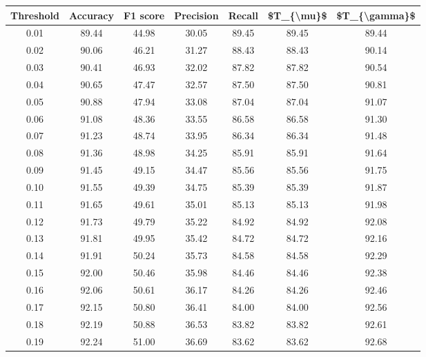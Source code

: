 \begin{tabular}{|c|c|c|c|c|c|c|}
\hline
 Threshold &  Accuracy &  F1 score &  Precision &  Recall &  \$T\_\{\textbackslash mu\}\$ &  \$T\_\{\textbackslash gamma\}\$ \\
\hline
      0.01 &     89.44 &     44.98 &      30.05 &   89.45 &      89.45 &         89.44 \\
      0.02 &     90.06 &     46.21 &      31.27 &   88.43 &      88.43 &         90.14 \\
      0.03 &     90.41 &     46.93 &      32.02 &   87.82 &      87.82 &         90.54 \\
      0.04 &     90.65 &     47.47 &      32.57 &   87.50 &      87.50 &         90.81 \\
      0.05 &     90.88 &     47.94 &      33.08 &   87.04 &      87.04 &         91.07 \\
      0.06 &     91.08 &     48.36 &      33.55 &   86.58 &      86.58 &         91.30 \\
      0.07 &     91.23 &     48.74 &      33.95 &   86.34 &      86.34 &         91.48 \\
      0.08 &     91.36 &     48.98 &      34.25 &   85.91 &      85.91 &         91.64 \\
      0.09 &     91.45 &     49.15 &      34.47 &   85.56 &      85.56 &         91.75 \\
      0.10 &     91.55 &     49.39 &      34.75 &   85.39 &      85.39 &         91.87 \\
      0.11 &     91.65 &     49.61 &      35.01 &   85.13 &      85.13 &         91.98 \\
      0.12 &     91.73 &     49.79 &      35.22 &   84.92 &      84.92 &         92.08 \\
      0.13 &     91.81 &     49.95 &      35.42 &   84.72 &      84.72 &         92.16 \\
      0.14 &     91.91 &     50.24 &      35.73 &   84.58 &      84.58 &         92.29 \\
      0.15 &     92.00 &     50.46 &      35.98 &   84.46 &      84.46 &         92.38 \\
      0.16 &     92.06 &     50.61 &      36.17 &   84.26 &      84.26 &         92.46 \\
      0.17 &     92.15 &     50.80 &      36.41 &   84.00 &      84.00 &         92.56 \\
      0.18 &     92.19 &     50.88 &      36.53 &   83.82 &      83.82 &         92.61 \\
      0.19 &     92.24 &     51.00 &      36.69 &   83.62 &      83.62 &         92.68 \\

\end{tabular}
